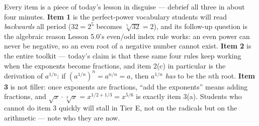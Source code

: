 \documentclass[10pt]{article}
\begin{document}
\begin{teachernote}
Every item is a piece of today's lesson in disguise --- debrief all three in about four minutes.
\textbf{Item 1} is the perfect-power vocabulary students will read \emph{backwards} all period
($32=2^5$ becomes $\sqrt[5]{32}=2$), and its follow-up question is the algebraic reason Lesson 5.0's
even/odd index rule works: an even power can never be negative, so an even root of a negative
number cannot exist. \textbf{Item 2} is the entire toolkit --- today's claim is that these same four
rules keep working when the exponents become fractions, and item 2(c) in particular is the
derivation of $a^{1/n}$: if $(a^{1/n})^n=a^{n/n}=a$, then $a^{1/n}$ \emph{has} to be the $n$th root.
\textbf{Item 3} is not filler: once exponents are fractions, ``add the exponents'' means adding
fractions, and $\sqrt{x}\cdot\sqrt[3]{x}=x^{1/2+1/3}=x^{5/6}$ is exactly item 3(a). Students who
cannot do item 3 quickly will stall in Tier E, not on the radicals but on the arithmetic --- note
who they are now.
\end{teachernote}
\end{document}
